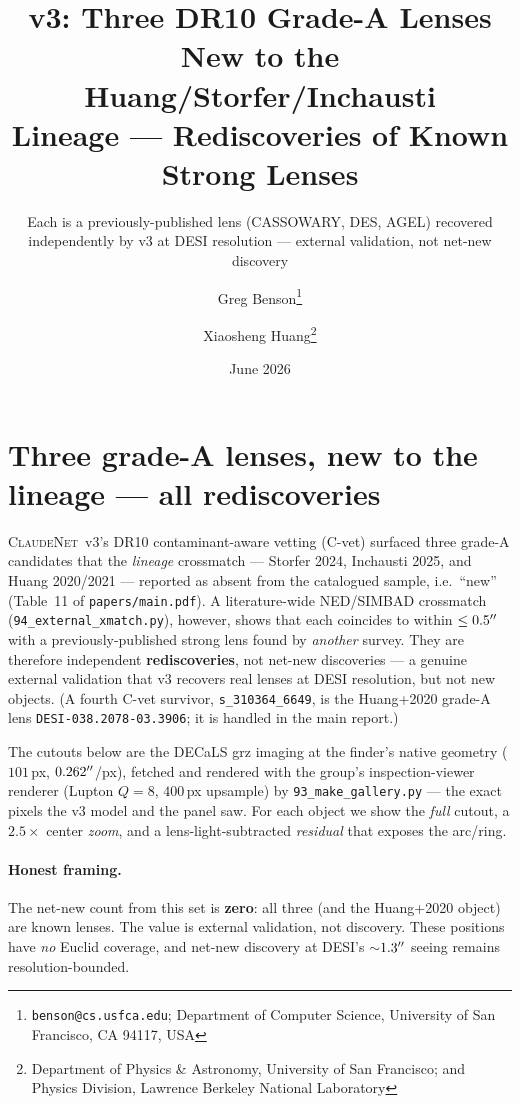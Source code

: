 \documentclass[11pt,letterpaper]{article}
\title{\cnet{} v3: Three DR10 Grade-A Lenses New to the Huang/Storfer/Inchausti\\
       Lineage --- Rediscoveries of Known Strong Lenses}
\author{Greg Benson\thanks{\texttt{benson@cs.usfca.edu}; Department of Computer
        Science, University of San Francisco, CA 94117, USA} \and
        Xiaosheng Huang\thanks{Department of Physics \& Astronomy, University of
        San Francisco; and Physics Division, Lawrence Berkeley National Laboratory}}
\date{June 2026}
\newcommand{\cnet}{\textsc{ClaudeNet}}
\begin{document}
\maketitle
\subtitle{Each is a previously-published lens (CASSOWARY, DES, AGEL) recovered independently by v3 at DESI resolution --- external validation, not net-new discovery}

\section{Three grade-A lenses, new to the lineage --- all rediscoveries}
\cnet{}~v3's DR10 contaminant-aware vetting (C-vet) surfaced three grade-A
candidates that the \emph{lineage} crossmatch --- Storfer 2024, Inchausti 2025,
and Huang 2020/2021 --- reported as absent from the catalogued sample, i.e.\
``new'' (Table~11 of \texttt{papers/main.pdf}). A literature-wide NED/SIMBAD
crossmatch (\texttt{94\_external\_xmatch.py}), however, shows that each coincides
to within $\le0.5^{\prime\prime}$ with a previously-published strong lens found by
\emph{another} survey. They are therefore independent \textbf{rediscoveries}, not
net-new discoveries --- a genuine external validation that v3 recovers real lenses
at DESI resolution, but not new objects. (A fourth C-vet survivor,
\texttt{s\_310364\_6649}, is the Huang+2020 grade-A lens
\texttt{DESI-038.2078-03.3906}; it is handled in the main report.)

The cutouts below are the DECaLS grz imaging at the finder's native geometry
($101$\,px, $0.262^{\prime\prime}$/px), fetched and rendered with the group's
inspection-viewer renderer (Lupton $Q{=}8$, $400$\,px upsample) by
\texttt{93\_make\_gallery.py} --- the exact pixels the v3 model and the panel saw.
For each object we show the \emph{full} cutout, a $2.5\times$ center \emph{zoom},
and a lens-light-subtracted \emph{residual} that exposes the arc/ring.

\paragraph{Honest framing.} The net-new count from this set is \textbf{zero}: all
three (and the Huang+2020 object) are known lenses. The value is external
validation, not discovery. These positions have \emph{no} Euclid coverage, and
net-new discovery at DESI's $\sim$$1.3^{\prime\prime}$ seeing remains resolution-bounded.
\end{document}
